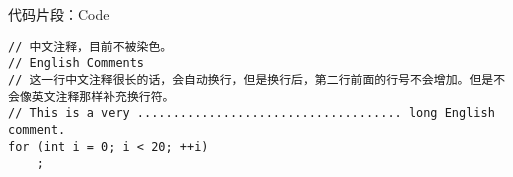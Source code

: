 ﻿\documentclass[UTF8]{ctexart}
\begin{document}
代码片段：Code
\begin{lstlisting}
// 中文注释，目前不被染色。
// English Comments
// 这一行中文注释很长的话，会自动换行，但是换行后，第二行前面的行号不会增加。但是不会像英文注释那样补充换行符。
// This is a very ..................................... long English comment.
for (int i = 0; i < 20; ++i)
	;
\end{lstlisting}
\end{document}
